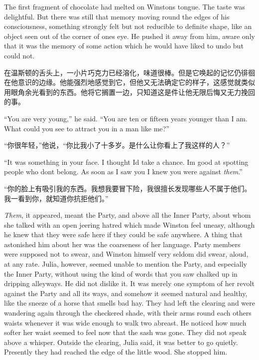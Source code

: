 \begin{paracol}{2}
\switchcolumn*

The first fragment of chocolate had melted on Winston\textquotesingle s
tongue. The taste was delightful. But there was still that memory moving
round the edges of his consciousness, something strongly felt but not
reducible to definite shape, like an object seen out of the corner of
one\textquotesingle s eye. He pushed it away from him, aware only that
it was the memory of some action which he would have liked to undo but
could not.

\switchcolumn

在温斯顿的舌头上，一小片巧克力已经溶化，味道很棒。但是它唤起的记忆仍徘徊在他意识的边缘。他能强烈地感觉到它，但他又无法确定它的样子，这感觉就类似用眼角余光看到的东西。他将它搁置一边，只知道这是件让他无限后悔又无力挽回的事。

\switchcolumn*

``You are very young,'' he said. ``You are ten or fifteen years younger
than I am. What could you see to attract you in a man like me?''

\switchcolumn

``你很年轻，''他说，``你比我小了十多岁。是什么让你看上了我这样的人？''

\switchcolumn*

``It was something in your face. I thought I\textquotesingle d take a
chance. I\textquotesingle m good at spotting people who
don\textquotesingle t belong. As soon as I saw you I knew you were
against \emph{them}.''

\switchcolumn

``你的脸上有吸引我的东西。我想我要冒下险，我很擅长发现哪些人不属于他们。我一看到你，就知道你抗拒他们。''

\switchcolumn*

\emph{Them}, it appeared, meant the Party, and above all the Inner
Party, about whom she talked with an open jeering hatred which made
Winston feel uneasy, although he knew that they were safe here if they
could be safe anywhere. A thing that astonished him about her was the
coarseness of her language. Party members were supposed not to swear,
and Winston himself very seldom did swear, aloud, at any rate. Julia,
however, seemed unable to mention the Party, and especially the Inner
Party, without using the kind of words that you saw chalked up in
dripping alleyways. He did not dislike it. It was merely one symptom of
her revolt against the Party and all its ways, and somehow it seemed
natural and healthy, like the sneeze of a horse that smells bad hay.
They had left the clearing and were wandering again through the
checkered shade, with their arms round each other\textquotesingle s
waists whenever it was wide enough to walk two abreast. He noticed how
much softer her waist seemed to feel now that the sash was gone. They
did not speak above a whisper. Outside the clearing, Julia said, it was
better to go quietly. Presently they had reached the edge of the little
wood. She stopped him.


\end{paracol}

